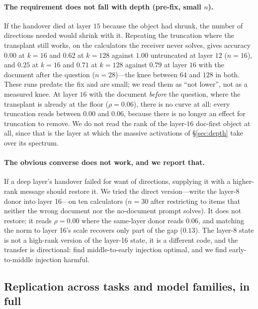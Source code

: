 \paragraph{The requirement does not fall with depth (pre-fix, small $n$).} If
the handover died at layer $15$ because the object had shrunk, the number of
directions needed would shrink with it. Repeating the truncation where the
transplant still works, on the calculators the receiver never solves, gives
accuracy $0.00$ at $k=16$ and $0.62$ at $k=128$ against $1.00$ untruncated at
layer $12$ ($n=16$), and $0.25$ at $k=16$ and $0.71$ at $k=128$ against $0.79$ at
layer $16$ with the document after the question ($n=28$)---the knee between $64$
and $128$ in both. These runs predate the fix and are small; we read them as
``not lower'', not as a measured knee. At layer $16$ with the document \emph{before} the question, where the
transplant is already at the floor ($\rho=0.06$), there is no curve at all:
every truncation reads between $0.00$ and $0.06$, because there is no longer an
effect for truncation to remove. We do not read the rank of the layer-$16$
doc-first object at all, since that is the layer at which the massive
activations of \S\ref{sec:depth} take over its spectrum.



\paragraph{The obvious converse does not work, and we report that.} If a deep
layer's handover failed for want of directions, supplying it with a higher-rank
message should restore it. We tried the direct version---write the layer-8
donor into layer 16---on ten calculators ($n=30$ after restricting to items that
neither the wrong document nor the no-document prompt solves). It does not
restore; it reads $\rho = 0.00$ where the same-layer donor reads $0.06$,
and matching the norm to layer 16's scale recovers only part of the gap
($0.13$). The layer-8 state is not a high-rank version of the layer-16 state, it
is a different code, and the transfer is directional:
\citet{ardoin2026promptcompression} find middle-to-early injection optimal, and
we find early-to-middle injection harmful.
\subsection{Replication across tasks and model families, in full}
\label{app:replication}

